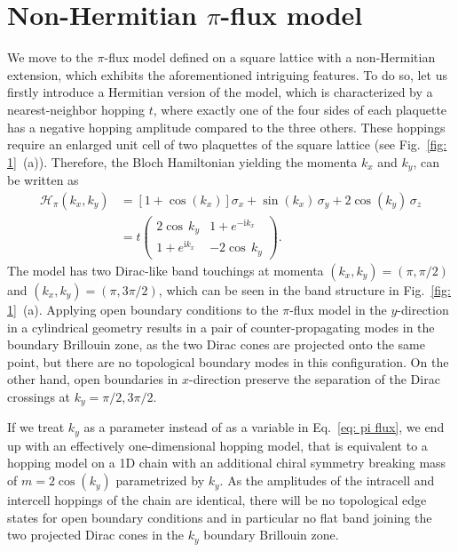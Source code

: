 \section{Non-Hermitian $\pi$-flux model}
\label{sec:nh-piflux}
We move to the $\pi$-flux model defined on a square lattice with a non-Hermitian extension, which exhibits the aforementioned intriguing features. To do so, let us firstly introduce a Hermitian version of the model, which is characterized by a nearest-neighbor hopping $t$, where exactly one of the four sides of each plaquette has a negative hopping amplitude compared to the three others. These hoppings require an enlarged unit cell of two plaquettes of the square lattice (see Fig.~\ref{fig: 1}~(a)). Therefore, the Bloch Hamiltonian yielding the momenta $k_x$ and $k_y$, can be written as
\begin{equation}
\begin{aligned}
\mathcal{H}_{\pi} (k_x,k_y) &= \left[1+\cos(k_x)\right]\sigma_x + \sin(k_x) \, \sigma_y + 2 \cos(k_y) \, \sigma_z \\
&=
t\begin{pmatrix}
2\cos\,k_y & 1+e^{-\mathrm{i} k_x} \\
1+e^{\mathrm{i} k_x} & -2\cos\,k_y
\end{pmatrix}.
\label{eq: pi flux}
\end{aligned}
\end{equation}
The model has two Dirac-like band touchings at momenta $(k_x, k_y)=(\pi,\pi/2)$ and $(k_x,k_y)=(\pi,3\pi/2)$, which can be seen in the band structure in Fig.~\ref{fig: 1}~(a). Applying open boundary conditions to the $\pi$-flux model in the $y$-direction in a cylindrical geometry results in a pair of counter-propagating modes in the boundary Brillouin zone, as the two Dirac cones are projected onto the same point, but there are no topological boundary modes in this configuration. On the other hand, open boundaries in $x$-direction preserve the separation of the Dirac crossings at $k_y = \pi/2, 3\pi/2$. 

If we treat $k_y$ as a parameter instead of as a variable in Eq.~\eqref{eq: pi flux}, we end up with an effectively one-dimensional hopping model, that is equivalent to a hopping model on a 1D chain with an additional chiral symmetry breaking mass of $ m = 2 \cos(k_y)$ parametrized by $k_y$. As the amplitudes of the intracell and intercell hoppings of the chain are identical, there will be no topological edge states for open boundary conditions and in particular no flat band joining the two projected Dirac cones in the $k_y$ boundary Brillouin zone.

